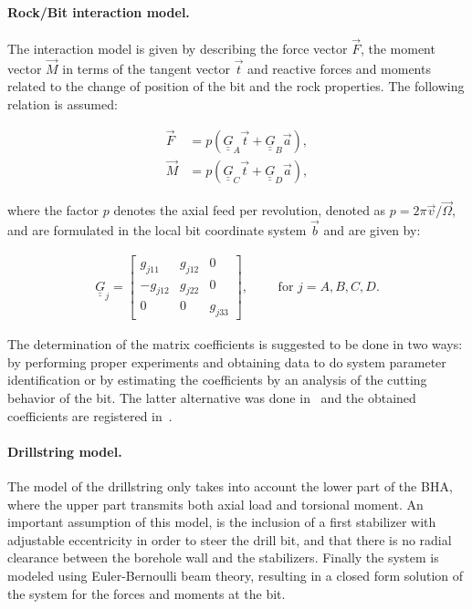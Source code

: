 \paragraph{Rock/Bit interaction model.} The interaction model is given by describing the force vector $\vec{F}$, the moment vector $\vec{M}$ in terms of the tangent vector $\vec{t}$ and reactive forces and moments related to the change of position of the bit and the rock properties. The following relation is assumed:

\begin{align}
	\vec{F} &= p (\underline{\underline{G}}_A \vec{t} + \underline{\underline{G}}_B \vec{a}),\nonumber \\
	\vec{M} &= p (\underline{\underline{G}}_C \vec{t} + \underline{\underline{G}}_D \vec{a}),
	\label{eq:bitrockneubert}
\end{align}

where the factor $p$ denotes the axial feed per revolution, denoted as $p = 2\pi \vec{v}/\vec{\Omega}$, and  are formulated in the local bit coordinate system $\vec{b}$ and are given by:

\begin{align}
	\underline{\underline{G}}_j = \begin{bmatrix}
	g_{j11} & g_{j12} & 0 \\
	-g_{j12} & g_{j22} & 0 \\
	0 & 0 & g_{j33}
	\end{bmatrix}, \qquad  \textrm{ for } j = A,B,C,D.
\end{align}

The determination of the matrix coefficients is suggested to be done in two ways: by performing proper experiments and obtaining data to do system parameter identification or by estimating the coefficients by an analysis of the cutting behavior of the bit. The latter alternative was done in~\cite{Neub97} and the obtained coefficients are registered in~\cite{NeubertM.andHeisig1997}.

\paragraph{Drillstring model.}

The model of the drillstring only takes into account the lower part of the BHA, where the upper part transmits both axial load and torsional moment. An important assumption of this model, is the inclusion of a first stabilizer with adjustable eccentricity in order to steer the drill bit, and that there is no radial clearance between the borehole wall and the stabilizers. Finally the system is modeled using Euler-Bernoulli beam theory, resulting in a closed form solution of the system for the forces and moments at the bit.

